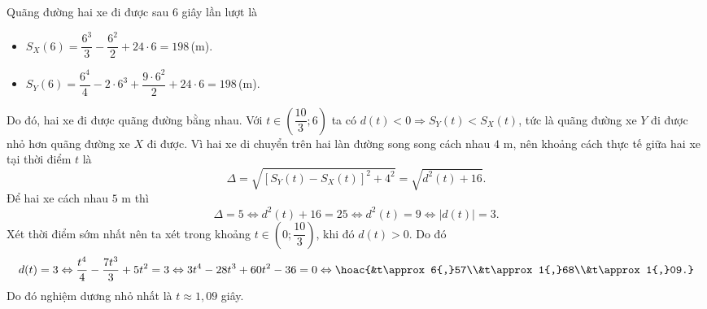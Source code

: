 \begin{ex}
{\begin{itemchoice}
			\itemch Quãng đường hai xe đi được sau $6$ giây lần lượt là
			\begin{itemize}
				\item $S_X(6) = \dfrac{6^3}{3} - \dfrac{6^2}{2} + 24 \cdot 6 = 198$\,(m).
				\item $S_Y(6) = \dfrac{6^4}{4} - 2 \cdot 6^3 + \dfrac{9 \cdot 6^2}{2} + 24 \cdot 6 = 198$\,(m).
			\end{itemize}
			Do đó, hai xe đi được quãng đường bằng nhau.
			\itemch Với $t \in \left(\dfrac{10}{3}; 6\right)$ ta có $d(t) < 0 \Rightarrow S_Y(t) < S_X(t)$, tức là quãng đường xe $Y$ đi được nhỏ hơn quãng đường xe $X$ đi được.
			\itemch Vì hai xe di chuyển trên hai làn đường song song cách nhau $4$ m, nên khoảng cách thực tế giữa hai xe tại thời điểm $t$ là
			\[\Delta = \sqrt{\left[S_Y(t) - S_X(t)\right]^2 + 4^2} = \sqrt{d^2(t) + 16}.\]
			Để hai xe cách nhau $5$ m thì
			\[\Delta = 5 \Leftrightarrow d^2(t) + 16 = 25 \Leftrightarrow d^2(t) = 9 \Leftrightarrow \left|d(t)\right| = 3.\]
			Xét thời điểm sớm nhất nên ta xét trong khoảng $t \in \left(0; \dfrac{10}{3}\right)$, khi đó $d(t) > 0$. Do đó
			\[d(t) = 3 \Leftrightarrow \dfrac{t^4}{4} - \dfrac{7t^3}{3} + 5t^2 = 3 \Leftrightarrow 3t^4 - 28t^3 + 60t^2 - 36 = 0\Leftrightarrow\hoac{&t\approx 6{,}57\\&t\approx 1{,}68\\&t\approx 1{,}09.}\]
			Do đó nghiệm dương nhỏ nhất là $t \approx 1{,}09$ giây.
		\end{itemchoice}
	}
\end{ex}

